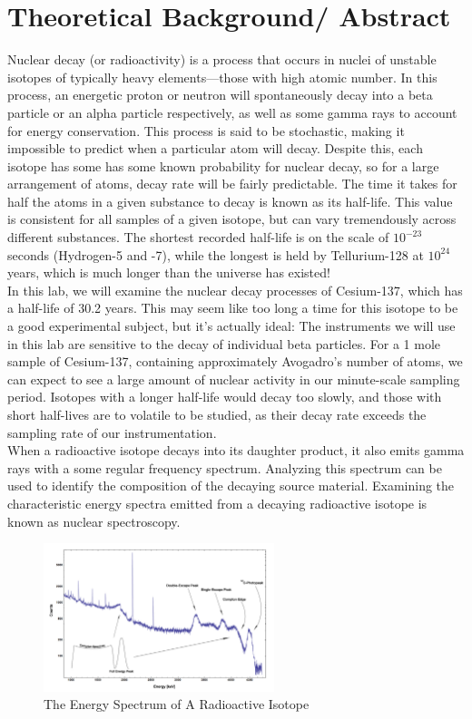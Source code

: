 \documentclass{amsart}
\begin{document}
\section{Theoretical Background/ Abstract}
Nuclear decay (or radioactivity) is a process that occurs in nuclei of unstable isotopes of typically heavy elements---those with high atomic number. In this process, an energetic proton or neutron will spontaneously decay into a beta particle or an alpha particle respectively, as well as some gamma rays to account for energy conservation. This process is said to be stochastic, making it impossible to predict when a particular atom will decay. Despite this, each isotope has some has some known probability for nuclear decay, so for a large arrangement of atoms, decay rate will be fairly predictable. The time it takes for half the atoms in a given substance to decay is known as its half-life. This value is consistent for all samples of a given isotope, but can vary tremendously across different substances. The shortest recorded half-life is on the scale of $10^{-23}$ seconds (Hydrogen-5 and -7), while the longest is held by Tellurium-128 at $10^{24}$ years, which is much longer than the universe has existed!\\

In this lab, we will examine the nuclear decay processes of Cesium-137, which has a half-life of 30.2 years. This may seem like too long a time for this isotope to be a good experimental subject, but it's actually ideal: The instruments we will use in this lab are sensitive to the decay of individual beta particles. For a 1 mole sample of Cesium-137, containing approximately Avogadro's number of atoms, we can expect to see a large amount of nuclear activity in our minute-scale sampling period. Isotopes with a longer half-life would decay too slowly, and those with short half-lives are to volatile to be studied, as their decay rate exceeds the sampling rate of our instrumentation.\\

When a radioactive isotope decays into its daughter product, it also emits gamma rays with a some regular frequency spectrum. Analyzing this spectrum can be used to identify the composition of the decaying source material. Examining the characteristic energy spectra emitted from a decaying radioactive isotope is known as nuclear spectroscopy.\\

\begin{figure}[H]
    \centering
    \label{graph}
    \includegraphics[width=0.6\textwidth]{graph.jpg}
    \caption{The Energy Spectrum of A Radioactive Isotope}
\end{figure}
\end{document}
